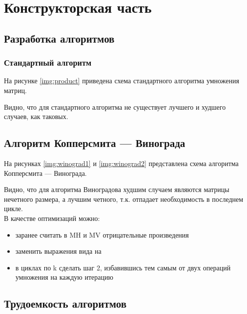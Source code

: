 \chapter{Конструкторская часть}

\section{Разработка алгоритмов}

\subsection{Стандартный алгоритм}

На рисунке \ref{img:product} приведена схема стандартного алгоритма умножения матриц.


Видно, что для стандартного алгоритма не существует лучшего и худшего случаев, как таковых.


\section{Алгоритм Копперсмита — Винограда}

На рисунках \ref{img:winograd1} и \ref{img:winograd2} представлена схема алгоритма Копперсмита — Винограда.



Видно, что для алгоритма Виноградова худшим случаем являются матрицы нечетного размера, а лучшим четного, т.к. отпадает необходимость в последнем цикле.\\
В качестве оптимизаций можно:
\begin{itemize}
	\item заранее считать в MH и MV отрицательные произведения
	\item заменить выражения вида  на 
	\item в циклах по k сделать шаг 2, избавившись тем самым от двух операций умножения на каждую итерацию
\end{itemize}

\section{Трудоемкость алгоритмов}

